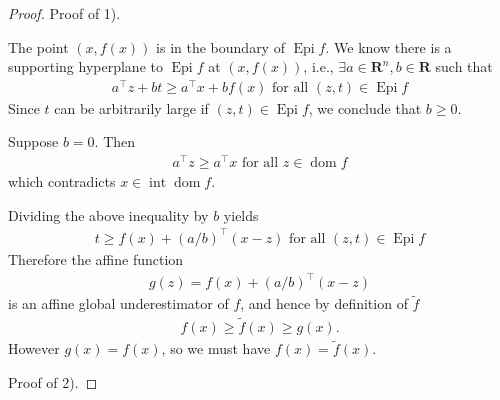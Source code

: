 \documentclass{article}
\newcommand{\inte}{\operatorname{int}}
\newcommand{\Epi}{\operatorname{Epi} }
\begin{document}
\begin{proof}\color{ForestGreen}
Proof of 1). 

The point $(x, f(x))$ is in the boundary of $\Epi f$. We know there is a supporting hyperplane to  $\Epi f$ at $(x, f(x))$, i.e., $\exists a \in \mathbf{R}^{n}, b \in \mathbf{R}$ such that
\begin{align*}
a^{\top} z+b t \geq a^{\top} x+b f(x) \text { for all }(z, t) \in \Epi  f
\end{align*}
Since $t$ can be arbitrarily large if $(z, t) \in \Epi  f$, we conclude that $b \geq 0$.

Suppose $b=0$. Then
\begin{align*}
a^{\top} z \geq a^{\top} x \text { for all } z \in \operatorname{dom} f
\end{align*}
which contradicts $x \in\inte \operatorname{dom} f .$ 

Dividing the above inequality by $b$ yields
\begin{align*}
t \geq f(x)+(a / b)^{\top}(x-z) \text { for all }(z, t) \in \Epi  f
\end{align*}
Therefore the affine function
\begin{align*}
g(z)=f(x)+(a / b)^{\top}(x-z)
\end{align*}
is an affine global underestimator of $f$, and hence by definition of $\tilde{f}$
\begin{align*}
f(x) \geq \tilde{f}(x) \geq g(x).
\end{align*}
However $g(x)=f(x)$, so we must have $f(x)=\tilde{f}(x)$.

Proof of 2).


\end{proof}
\end{document}
